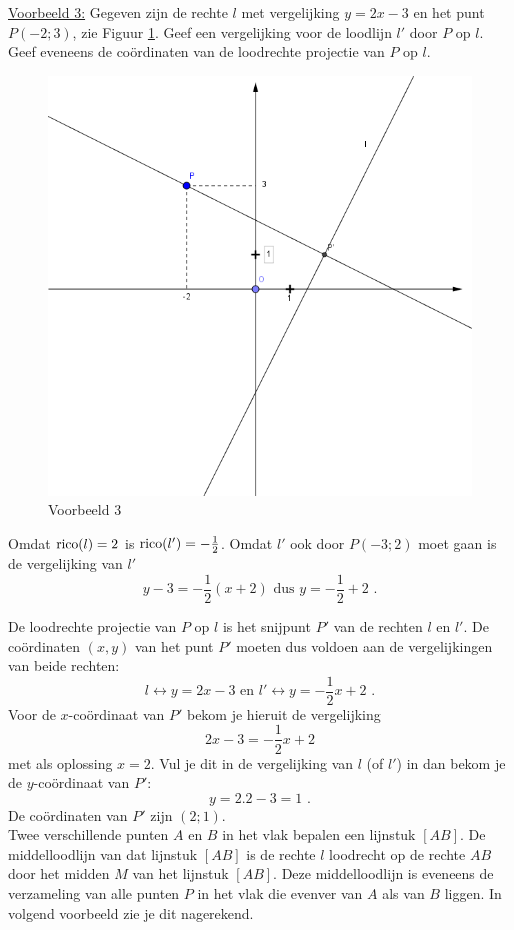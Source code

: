\noindent \underline{Voorbeeld 3:} Gegeven zijn de rechte $l$ met vergelijking $y=2x-3$ en het punt $P(-2;3)$, zie Figuur \ref{fig4.2.10_fig3}.
Geef een vergelijking voor de loodlijn $l'$ door $P$ op $l$.
Geef eveneens de co\"ordinaten van de loodrechte projectie van $P$ op $l$.
\begin{figure}[!htb]
\begin{center}
\includegraphics[height=7 cm]{4_opp_inhoud_an_meetk/inputs/AMTekst5Fig3}
\caption{Voorbeeld 3}
\label{fig4.2.10_fig3}
\end{center}
\end{figure} 
Omdat $\operatorname{rico} (l)=2$ is $\operatorname{rico} (l')=-\frac{1}{2}$.
Omdat $l'$ ook door $P(-3;2)$ moet gaan is de vergelijking van $l'$
\[
y-3=-\frac{1}{2}(x+2) \text { dus } y=-\frac{1}{2}+2 \text { .}
\]

De loodrechte projectie van $P$ op $l$ is het snijpunt $P'$ van de rechten $l$ en $l'$.
De co\"ordinaten $(x,y)$ van het punt $P'$ moeten dus voldoen aan de vergelijkingen van beide rechten:
\[
l \leftrightarrow y=2x-3 \text { en } l' \leftrightarrow y=-\frac{1}{2}x+2 \text { .}
\]
Voor de $x$-co\"ordinaat van $P'$ bekom je hieruit de vergelijking
\[
2x-3=-\frac{1}{2}x+2
\]
met als oplossing $x=2$.
Vul je dit in de vergelijking van $l$ (of $l'$) in dan bekom je de $y$-co\"ordinaat van $P'$:
\[
y=2.2-3=1 \text { .}
\]
De co\"ordinaten van $P'$ zijn $(2;1)$.\\

Twee verschillende punten $A$ en $B$ in het vlak bepalen een lijnstuk $[AB]$.
De middelloodlijn van dat lijnstuk $[AB]$ is de rechte $l$ loodrecht op de rechte $AB$ door het midden $M$ van het lijnstuk $[AB]$.
Deze middelloodlijn is eveneens de verzameling van alle punten $P$ in het vlak die evenver van $A$ als van $B$ liggen.
In volgend voorbeeld zie je dit nagerekend.\\

